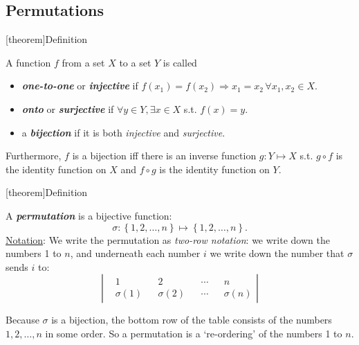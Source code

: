 \documentclass[12pt]{report}
\theoremstyle{definition}
\begin{document}
\subsection{Permutations}

[theorem]{Definition}
\begin{function classification}
    A function $f$ from a set $X$ to a set $Y$ is called
    \begin{itemize}
            \item \textbf{\emph{one-to-one}} or \textbf{\emph{injective}} 
                if $f(x_1) = f(x_2) \Rightarrow{}x_1 = x_2 \,\forall x_1, x_2 \in{}X$.
                
            \item \textbf{\emph{onto}} or \textbf{\emph{surjective}} if
                $\forall y \in{}Y, \exists x \in{}X$ s.t. $f(x) = y$.

            \item a \textbf{\emph{bijection}} if it is both \emph{injective} and \emph{surjective}.
    \end{itemize}
\end{function classification}

Furthermore, $f$ is a bijection iff there is an inverse function $g: Y \mapsto X$
s.t. $g \circ f$ is the identity function on $X$ and $f \circ g$ is the identity function on $Y$.


[theorem]{Definition}
\begin{permutation}
    A \textbf{\emph{permutation}} is a bijective function:\[
        \sigma : \left\{1, 2, \ldots, n\right\} \mapsto \left\{1, 2, \ldots, n\right\}.
    \]
    \underline{Notation}: We write the permutation as \emph{two-row notation}:
    we write down the numbers 1 to $n$, and underneath each number $i$
    we write down the number that $\sigma$ sends $i$ to:\[
        \left|
        \begin{align*}
            & 1 && 2 && \cdots && n \\
            & \sigma(1) && \sigma(2) && \cdots && \sigma(n)
        \end{align*}
        \right| 
    \]
\end{permutation}

    Because $\sigma$ is a bijection, the bottom row of the table consists of the numbers
    $1, 2, \ldots, n$ in some order. So a permutation is a `re-ordering' of the numbers 1 to $n$.
\end{document}
